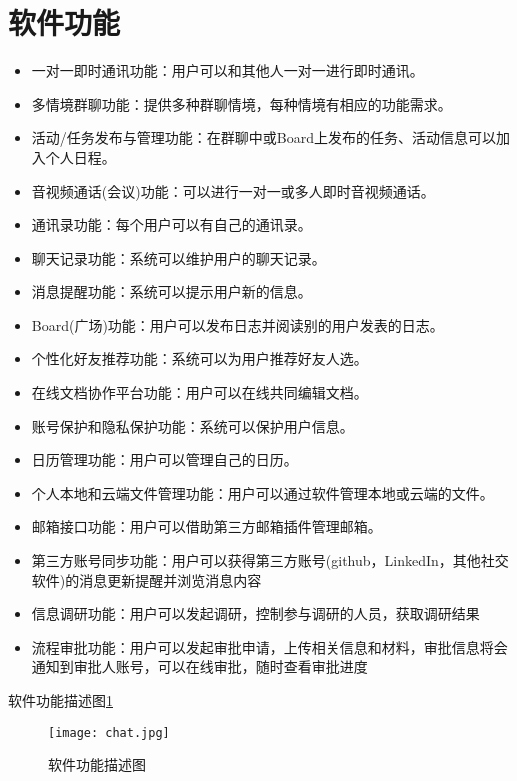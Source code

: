 \section{\color{red}软件功能}
\begin{itemize}
	\item 一对一即时通讯功能：用户可以和其他人一对一进行即时通讯。
	\item 多情境群聊功能：提供多种群聊情境，每种情境有相应的功能需求。
	\item 活动/任务发布与管理功能：在群聊中或Board上发布的任务、活动信息可以加入个人日程。
	\item 音视频通话(会议)功能：可以进行一对一或多人即时音视频通话。
	\item 通讯录功能：每个用户可以有自己的通讯录。
	\item 聊天记录功能：系统可以维护用户的聊天记录。
	\item 消息提醒功能：系统可以提示用户新的信息。
	\item Board(广场)功能：用户可以发布日志并阅读别的用户发表的日志。
	\item 个性化好友推荐功能：系统可以为用户推荐好友人选。
	\item 在线文档协作平台功能：用户可以在线共同编辑文档。
	\item 账号保护和隐私保护功能：系统可以保护用户信息。
	\item 日历管理功能：用户可以管理自己的日历。
	\item 个人本地和云端文件管理功能：用户可以通过软件管理本地或云端的文件。
	\item 邮箱接口功能：用户可以借助第三方邮箱插件管理邮箱。
	\item {\color{red} 第三方账号同步功能：用户可以获得第三方账号(github，LinkedIn，其他社交软件)的消息更新提醒并浏览消息内容}
	\item {\color{red} 信息调研功能：用户可以发起调研，控制参与调研的人员，获取调研结果}
	\item {\color{red} 流程审批功能：用户可以发起审批申请，上传相关信息和材料，审批信息将会通知到审批人账号，可以在线审批，随时查看审批进度}
\end{itemize}
{\color{red}软件功能描述图}\ref{fig:function}
\newpage
\begin{figure}[ht]
	\centering
	\texttt{[image: chat.jpg]}\label{tab:classification}
	\caption{\color{red}软件功能描述图}\label{fig:function}
	\newpage
\end{figure}
\newpage
